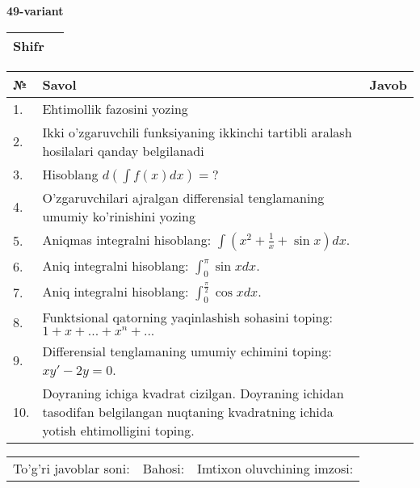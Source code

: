 \documentclass{article}
\begin{document}
  \egroup
  
  \newpage
  
  
  \textbf{49-variant}\\
  
  \bgroup
  \def\arraystretch{1.6} %
  
  \begin{tabular}{|m{5.7cm}|m{9.5cm}|}
  \hline
  Shifr & \\
  \hline
  \end{tabular}
  
  \vspace{1cm}
  
  \begin{tabular}{|m{0.7cm}|m{10cm}|m{4cm}|}
  \hline
  № & Savol & Javob \\
  \hline
  1. & Ehtimollik fazosini yozing &  \\
  \hline
  2. & Ikki o'zgaruvchili funksiyaning ikkinchi tartibli aralash hosilalari qanday belgilanadi &  \\
  \hline
  3. & Hisoblang \(d\left( \int {f(x)dx} \right) = ?\) &  \\
  \hline
  4. & O'zgaruvchilari ajralgan differensial tenglamaning umumiy ko'rinishini yozing &  \\
  \hline
  5. & Aniqmas integralni hisoblang: \(\int {\left( x^{2} + \frac{1}{x} + \sin x \right)dx}\). &  \\
  \hline
  6. & Aniq integralni hisoblang: \(\int_{0}^{\pi}{\sin xdx}\). &  \\
  \hline
  7. & Aniq integralni hisoblang: \(\int_{0}^{\frac{\pi}{2}}{\cos xdx}\). &  \\
  \hline
  8. & Funktsional qatorning yaqinlashish sohasini toping:\(1 + x + ... + x^{n} + ...\) &  \\
  \hline
  9. & Differensial tenglamaning umumiy echimini toping: \(xy' - 2y = 0\). &  \\
  \hline
  10. & Doyraning ichiga kvadrat cizilgan. Doyraning ichidan tasodifan belgilangan nuqtaning kvadratning ichida yotish ehtimolligini toping. &  \\
  \hline
  \end{tabular}
  
  \vspace{1cm}
  
  \begin{tabular}{lll}
  To'g'ri javoblar soni: \underline{\hspace{1.5cm}} & 
  Bahosi: \underline{\hspace{1.5cm}} & 
  Imtixon oluvchining imzosi: \underline{\hspace{2cm}} \\
  \end{tabular}
  
\end{document}

